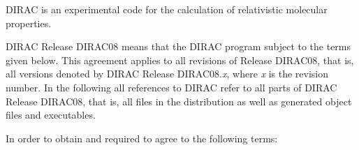 \addtolength{\textwidth}{4cm} 
\addtolength{\hoffset}{-2cm}
\addtolength{\textheight}{4cm}
\addtolength{\voffset}{-2cm}

\usepackage{charter}

\pagestyle{empty}




DIRAC is an experimental code for the calculation of
relativistic molecular properties.

DIRAC Release DIRAC08 means that
the DIRAC program subject to the terms given below.
This agreement applies to all revisions of Release DIRAC08,
that is, all versions denoted by DIRAC Release DIRAC08.{\em x}, where {\em x}
is the revision number.
In the following all references to DIRAC refer
to all parts of DIRAC Release DIRAC08, that is, all files in the distribution
as well as generated object files and executables.

In order to obtain and
required to agree to the following terms:

